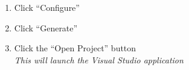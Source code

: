 \begin{enumerate}
\begin{enumerate}
\begin{enumerate}
				\end{enumerate}
			\item Replace the Python paths in the PYTHON\_EXECUTABLE, PYTHON\_INCLUDE\_DIR, and PYTHON\_LIBRARY values to point to where your PyEMTGEnv is located (e.g. \verb|C:/Users/YourName/AppData/Local/mambaforge/envs/PyEmtgEnv/*|)
		\end{enumerate}
	\item Click ``Configure''
	\item Click ``Generate''
	\item Click the ``Open Project'' button \\ \emph{This will launch the Visual Studio application}
\end{enumerate}
